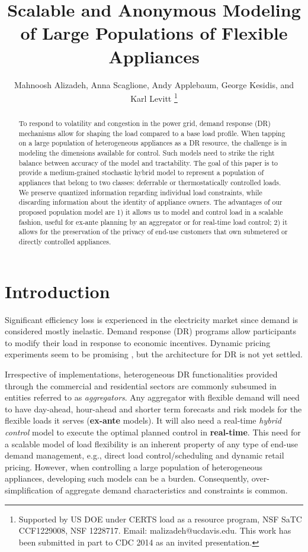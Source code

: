 \documentclass[10pt]{IEEEtran}
\title{Scalable and Anonymous Modeling of Large
Populations of Flexible Appliances}
\author{Mahnoosh Alizadeh, Anna Scaglione, Andy Applebaum, George Kesidis, and Karl Levitt \thanks{Supported by US DOE under CERTS load as a resource program, NSF SaTC CCF1229008, NSF 1228717. Email: malizadeh@ucdavis.edu. This work has been submitted in part to CDC 2014 as an invited presentation.}
}
\begin{document}
\maketitle

\begin{abstract}
To respond to volatility and congestion in the power grid, demand response (DR) mechanisms allow for shaping the load compared to a base load profile. When tapping on a large population of heterogeneous appliances as a DR resource, 
the challenge is in modeling the dimensions available for control. Such models need to strike the right balance between accuracy of the model and tractability.  
The goal of this paper is to provide a medium-grained stochastic hybrid model to represent a population of appliances that belong to two classes: deferrable or thermostatically controlled loads. We preserve quantized information regarding  individual load constraints, while discarding information about the identity of appliance owners. The advantages of our proposed population model are 1)  it allows us to model and control load in a scalable fashion, useful for ex-ante planning  by an aggregator or for real-time load control; 2) it allows for the preservation of the privacy of end-use customers that own submetered or directly controlled appliances.
\end{abstract}

\section{Introduction}\label{sec.intro}
Significant efficiency loss is experienced in the electricity market since demand is considered mostly inelastic.  
Demand response (DR) programs allow participants  to modify their load in response to economic incentives.  Dynamic pricing experiments seem to be promising \cite{hammerstrom2007pacific}, but the architecture for DR is not yet settled.   



 Irrespective of implementations,   heterogeneous DR functionalities provided through the commercial and residential sectors are commonly subsumed in entities referred to as {\it aggregators}. 
Any aggregator with flexible demand will need to have day-ahead, hour-ahead and shorter term forecasts and risk models for the flexible loads it serves ({\bf ex-ante} models). It will also need a real-time {\it hybrid control} model to execute the optimal planned control in {\bf real-time}.  This need for a scalable model of load flexibility is an inherent property of any type of end-use demand management, e.g., direct load control/scheduling and dynamic retail pricing. However, when controlling a large population of heterogeneous appliances, developing such models can be a burden. Consequently, over-simplification of aggregate demand characteristics and constraints is common.
 
\end{document}
